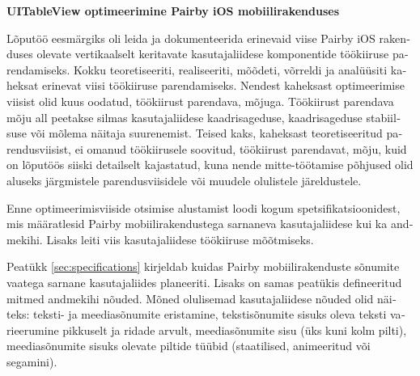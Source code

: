 \documentclass[a4paper,12pt]{article}
\begin{document}
\begin{otherlanguage}{estonian}

\textbf{UITableView optimeerimine Pairby iOS mobiilirakenduses}

Lõputöö eesmärgiks oli leida ja dokumenteerida erinevaid viise Pairby iOS rakenduses olevate vertikaalselt keritavate kasutajaliidese komponentide töökiiruse parendamiseks. Kokku teoretiseeriti, realiseeriti, mõõdeti, võrreldi ja analüüsiti kaheksat erinevat viisi töökiiruse parendamiseks. Nendest kaheksast optimeerimise viisist olid kuus oodatud, töökiirust parendava, mõjuga. Töökiirust parendava mõju all peetakse silmas kasutajaliidese kaadrisageduse, kaadrisageduse stabiilsuse või mõlema näitaja suurenemist. Teised kaks, kaheksast teoretiseeritud parendusviisist, ei omanud töökiirusele soovitud, töökiirust parendavat, mõju, kuid on lõputöös siiski detailselt kajastatud, kuna nende mitte-töötamise põhjused olid aluseks järgmistele parendusviisidele või muudele olulistele järeldustele.

Enne optimeerimisviiside otsimise alustamist loodi kogum spetsifikatsioonidest, mis määratlesid Pairby mobiilirakendustega sarnaneva kasutajaliidese kui ka andmekihi. Lisaks leiti viis kasutajaliidese töökiiruse mõõtmiseks.

Peatükk \ref{sec:specifications} kirjeldab kuidas Pairby mobiilirakenduste sõnumite vaatega sarnane kasutajaliides planeeriti. Lisaks on samas peatükis defineeritud mitmed andmekihi nõuded. Mõned olulisemad kasutajaliidese nõuded olid näiteks: teksti- ja meediasõnumite eristamine, tekstisõnumite sisuks oleva teksti varieerumine pikkuselt ja ridade arvult, meediasõnumite sisu (üks kuni kolm pilti), meediasõnumite sisuks olevate piltide tüübid (staatilised, animeeritud või segamini).


\end{otherlanguage}
\end{document}
